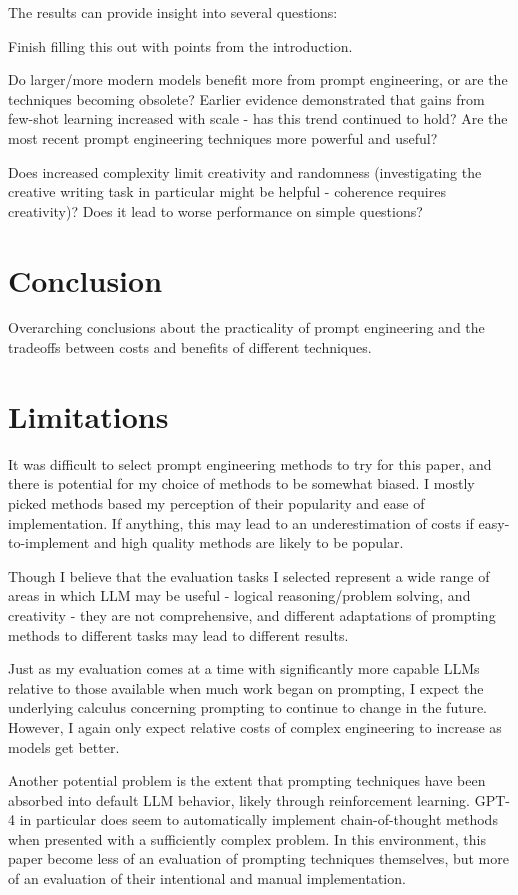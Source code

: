 \documentclass[11pt]{article}
\begin{document}
The results can provide insight into several questions:

Finish filling this out with points from the introduction.

Do larger/more modern models benefit more from prompt engineering, or are the techniques becoming obsolete? Earlier evidence demonstrated that gains from few-shot learning increased with scale - has this trend continued to hold? \cite{brown_language_2020} Are the most recent prompt engineering techniques more powerful and useful?

Does increased complexity limit creativity and randomness (investigating the creative writing task in particular might be helpful - coherence requires creativity)? Does it lead to worse performance on simple questions?

\section*{Conclusion}

Overarching conclusions about the practicality of prompt engineering and the tradeoffs between costs and benefits of different techniques.

\section*{Limitations}

It was difficult to select prompt engineering methods to try for this paper, and there is potential for my choice of methods to be somewhat biased. I mostly picked methods based my perception of their popularity and ease of implementation. If anything, this may lead to an underestimation of costs if easy-to-implement and high quality methods are likely to be popular. 

Though I believe that the evaluation tasks I selected represent a wide range of areas in which LLM may be useful - logical reasoning/problem solving, and creativity - they are not comprehensive, and different adaptations of prompting methods to different tasks may lead to different results.

Just as my evaluation comes at a time with significantly more capable LLMs relative to those available when much work began on prompting, I expect the underlying calculus concerning prompting to continue to change in the future. However, I again only expect relative costs of complex engineering to increase as models get better.

Another potential problem is the extent that prompting techniques have been absorbed into default LLM behavior, likely through reinforcement learning. GPT-4 in particular does seem to automatically implement chain-of-thought methods when presented with a sufficiently complex problem. In this environment, this paper become less of an evaluation of prompting techniques themselves, but more of an evaluation of their intentional and manual implementation.
\end{document}
